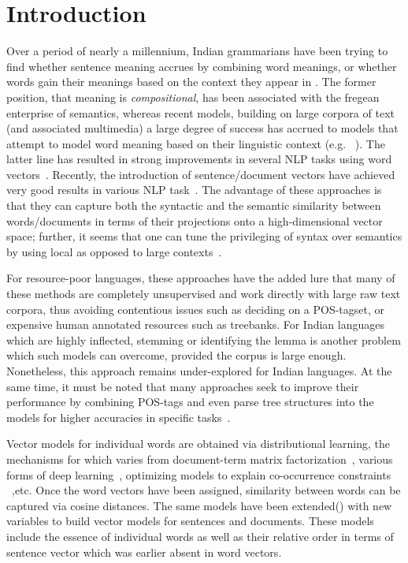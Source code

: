 \chapter{Introduction}
Over a period of nearly a millennium, Indian grammarians have been trying to find whether sentence meaning accrues by combining word meanings, or whether words gain their meanings based on the context they appear in \cite{Matilal:90}.  The former position, that meaning is {\em compositional}, has been associated with the fregean enterprise of semantics, whereas recent models, building on large corpora of text (and associated multimedia) a large degree of success has accrued to models that attempt to model word meaning based on their linguistic context (e.g. ~\cite{Landauer:97}). The latter line has resulted in strong improvements in several NLP tasks using word vectors~\cite{Collobert:08,Turian:10,Mikolov:13a,Socher:13}. Recently, the introduction of sentence/document vectors have achieved very good results in various NLP task~\cite{Le:14}. The advantage of these approaches is that they can capture both the syntactic and the semantic similarity between words/documents in terms of their projections onto a high-dimensional vector space; further, it seems that one can tune the privileging of syntax over semantics by using local as opposed to large contexts~\cite{Huang:12}. 

For resource-poor languages, these approaches have the added lure that many of these methods are completely unsupervised and work directly with large raw text corpora, thus avoiding contentious issues such as deciding on a POS-tagset, or expensive human annotated resources such as treebanks.  For Indian languages which are highly inflected, stemming or identifying the lemma is another problem
which such models can overcome, provided the corpus is large enough. Nonetheless, this approach remains under-explored for Indian languages. At the same time, it must be noted that many approaches seek to improve their performance by combining POS-tags and even parse tree structures into the models for higher accuracies in specific tasks~\cite{Socher:13}. 

Vector models for individual words are obtained via distributional learning, the mechanisms for which varies from document-term matrix factorization~\cite{Landauer:97}, various forms of deep learning~\cite{Collobert:08,Turian:10,Socher:13}, optimizing models to explain co-occurrence constraints ~\cite{Mikolov:13a,Pennington:14},etc. Once the word vectors have been assigned, similarity between words can be captured via cosine distances. The same models have been extended(\cite{Le:14}) with new variables to build vector models for sentences and documents. These models include the essence of individual words as well as their relative order in terms of sentence vector which was earlier absent in word vectors.

